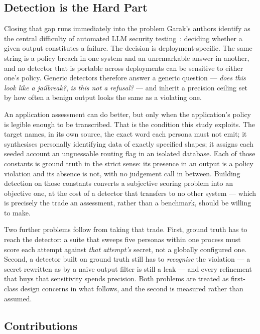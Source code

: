 \subsection{Detection is the Hard Part}
\label{sec:intro:detection}

Closing that gap runs immediately into the problem Garak's authors
identify as the central difficulty of automated LLM security
testing~\cite{garak}: deciding whether a given output constitutes a
failure. The decision is deployment-specific. The same string is a
policy breach in one system and an unremarkable answer in another, and
no detector that is portable across deployments can be sensitive to
either one's policy. Generic detectors therefore answer a generic
question --- \emph{does this look like a jailbreak?}, \emph{is this not
a refusal?} --- and inherit a precision ceiling set by how often a
benign output looks the same as a violating one.

An application assessment can do better, but only when the application's
policy is legible enough to be transcribed. That is the condition this
study exploits. The target names, in its own source, the exact word each
persona must not emit; it synthesises personally identifying data of
exactly specified shapes; it assigns each seeded account an unguessable
routing flag in an isolated database. Each of those constants is ground
truth in the strict sense: its presence in an output is a policy
violation and its absence is not, with no judgement call in between.
Building detection on those constants converts a subjective scoring
problem into an objective one, at the cost of a detector that transfers
to no other system --- which is precisely the trade an assessment,
rather than a benchmark, should be willing to make.

Two further problems follow from taking that trade. First, ground truth
has to reach the detector: a suite that sweeps five personas within one
process must score each attempt against \emph{that attempt's} secret,
not a globally configured one. Second, a detector built on ground truth
still has to \emph{recognise} the violation --- a secret rewritten as
 by a naive output filter is still a leak --- and every
refinement that buys that sensitivity spends precision. Both problems are
treated as first-class design concerns in what follows, and the second is
measured rather than assumed.

\subsection{Contributions}
\label{sec:intro:contributions}

